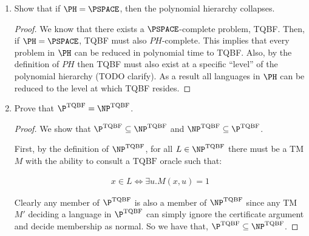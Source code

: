 \documentclass[usletter]{article}
\begin{document}
\begin{enumerate}
      \begin{proof}
        To show that $\P \subset \PSPACE$ we must show that for all languages $L_1 \in \P$ that also $L_1 \in \PSPACE$ and we must exhibit at least one language $L_2 \in \PSPACE$ that is not in $\P$.

        By the definition of $\P$ we know there must exist a Turing machine $M_1$ that decides $L_1$ in polynomial time $p(n)$. Also, by the definition of $\PSPACE$, any Turing machine $M_1$ that decides a language $L_1$ must do so in polynomial space. Then the first requirement is immediate since any $M_1$ running in polynomial time $p(n)$ can write to at most $p(n)$ cells if it does nothing else. So we have that $\P \subseteq \PSPACE$.

        To finish we note that the language TQBF $\in \PSPACE$

        TODO cite notes/book for tqbq
      \end{proof}

    \item Show that if $\PH = \PSPACE$, then the polynomial hierarchy collapses.

      \begin{proof}
        We know that there exists a $\PSPACE$-complete problem, TQBF. Then, if $\PH = \PSPACE$, TQBF must also $PH$-complete. This implies that every problem in $\PH$ can be reduced in polynomial time to TQBF. Also, by the definition of $PH$ then TQBF must also exist at a specific ``level'' of the polynomial hierarchy (TODO clarify). As a result all languages in $\PH$ can be reduced to the level at which TQBF resides.
      \end{proof}


    \item Prove that $\P^{\text{TQBF}} = \NP^{\text{TQBF}}$.

      \begin{proof}
        We show that $\P^{\text{TQBF}} \subseteq \NP^{\text{TQBF}}$ and $\NP^{\text{TQBF}} \subseteq \P^{\text{TQBF}}$.

        First, by the definition of $\NP^{\text{TQBF}}$, for all $L \in \NP^{\text{TQBF}}$ there must be a TM $M$ with the ability to consult a $\text{TQBF}$ oracle such that:

      \begin{align}
        x \in L \iff \exists u.M(x,u) = 1
      \end{align}

      Clearly any member of $\P^{\text{TQBF}}$ is also a member of $\NP^{\text{TQBF}}$ since any TM $M'$ deciding a language in $\P^{\text{TQBF}}$ can simply ignore the certificate argument and decide membership as normal. So we have that, $\P^{\text{TQBF}} \subseteq \NP^{\text{TQBF}}$.


\end{proof}
\end{enumerate}
\end{document}

